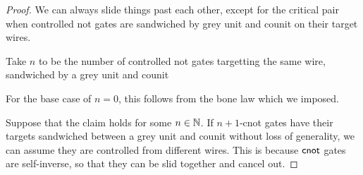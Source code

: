 \begin{proof}
We can always slide things past each other, except for the critical pair  when controlled not gates are sandwiched by grey unit and counit on their target wires.

Take $n$ to be the number of controlled not gates targetting the same wire, sandwiched by a grey unit and counit

For the base case of $n=0$, this follows from the bone law which we imposed.

Suppose that the claim holds for some $n \in \mathbb{N}$. If $n+1$-cnot gates have their targets sandwiched between a grey unit and counit without loss of generality, we can assume they are controlled from different wires.  This is because  $\mathsf{cnot}$ gates are self-inverse, so that they can be slid together and cancel out.


\end{proof}
